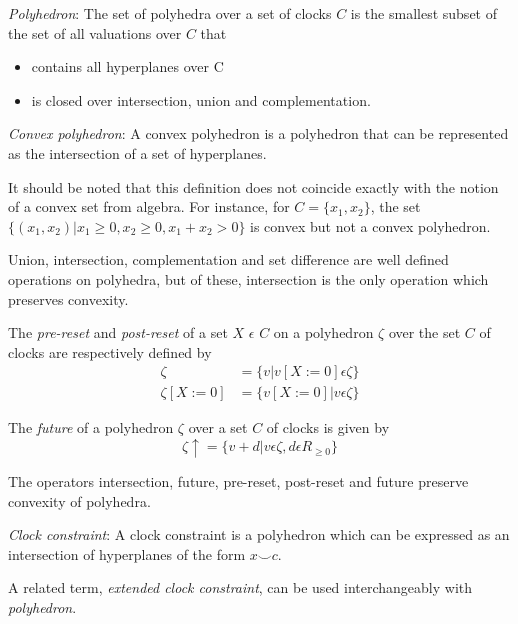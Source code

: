 \begin{definition}
\emph{Polyhedron}: The set of polyhedra over a set of clocks $C$ is
the smallest subset of the set of all valuations over $C$ that 
\begin{itemize}
\item contains all hyperplanes over C
\item is closed over intersection, union and complementation.
\end{itemize}
\end{definition}

\begin{definition}
\emph{Convex polyhedron}: A convex polyhedron is a polyhedron that can
be represented as the intersection of a set of hyperplanes.
\end{definition}

It should be noted that this definition does not coincide exactly with
the notion of a convex set from algebra. For instance, for
$C=\{x_1, x_2\}$, the set $\{(x_1, x_2)| x_1 \geq 0, x_2 \geq 0, x_1 +
x_2 > 0\}$ is convex but not a convex polyhedron.

Union, intersection, complementation and set difference are well
defined operations on polyhedra, but of these, intersection is the
only operation which preserves convexity.

The \emph{pre-reset} and \emph{post-reset} of a set $X$ $\epsilon$ $C$ on a
polyhedron $\zeta$ over the set $C$ of clocks are respectively defined
by
\begin{align*}
[X := 0]\zeta &= \{v| v[X := 0] \epsilon \zeta \} \\
\zeta[X := 0] &= \{v[X := 0]| v \epsilon \zeta \}
\end{align*}

The \emph{future} of a polyhedron $\zeta$ over a set $C$ of clocks
is given by 
\begin{displaymath}
\zeta \uparrow = \{v + d| v \epsilon \zeta, d \epsilon R_{\geq 0}\}
\end{displaymath}

The operators intersection, future, pre-reset, post-reset and future
preserve convexity of polyhedra.

\begin{definition}
\emph{Clock constraint}: A clock constraint is a polyhedron which can
be expressed as an intersection of hyperplanes of the form $x \smile
c$.
\end{definition}

A related term, \emph{extended clock constraint}, can be used
interchangeably with \emph{polyhedron}.


